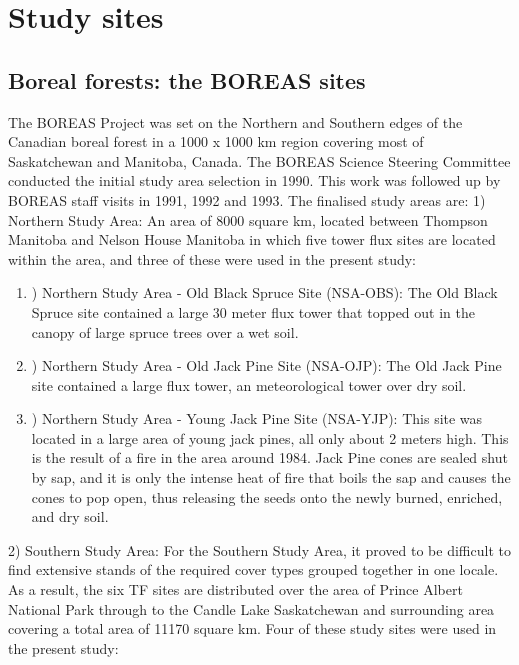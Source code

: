 \section{Study sites}

\subsection{Boreal forests: the BOREAS sites}

The BOREAS Project was set on the Northern and Southern edges of the Canadian boreal forest in a 1000 x 1000 km region covering most of Saskatchewan and Manitoba, Canada. The BOREAS Science Steering Committee conducted the initial study area selection in 1990. This work was followed up by BOREAS staff visits in 1991, 1992 and 1993. The finalised study areas are: 1) Northern Study Area: An area of 8000 square km, located between Thompson Manitoba and Nelson House Manitoba in which five tower flux sites are located within the area, and three of these were used in the present study:
\begin{enumerate}[i]
 \item) Northern Study Area - Old Black Spruce Site (NSA-OBS): The Old Black Spruce site contained a large 30 meter flux tower that topped out in the canopy of large spruce trees over a wet soil.
 \item) Northern Study Area - Old Jack Pine Site (NSA-OJP): The Old Jack Pine site contained a large flux tower, an meteorological tower over dry soil.
 \item) Northern Study Area - Young Jack Pine Site (NSA-YJP): This site was located in a large area of young jack pines, all only about 2 meters high. This is the result of a fire in the area around 1984. Jack Pine cones are sealed shut by sap, and it is only the intense heat of fire that boils the sap and causes the cones to pop open, thus releasing the seeds onto the newly burned, enriched, and dry soil.
\end{enumerate}
2) Southern Study Area: For the Southern Study Area, it proved to be difficult to find extensive stands of the required cover types grouped together in one locale. As a result, the six TF sites are distributed over the area of Prince Albert National Park through to the Candle Lake Saskatchewan and surrounding area covering a total area of 11170 square km. Four of these study sites were used in the present study:
